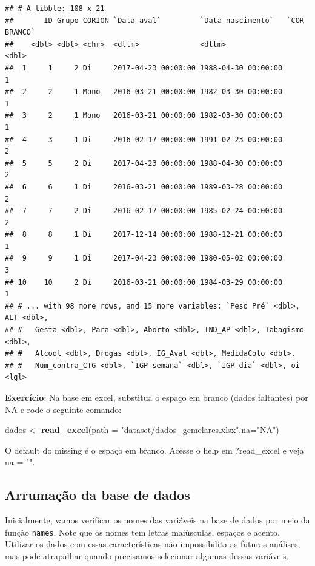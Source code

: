 \documentclass[
]{book}
\newenvironment{Shaded}{\begin{snugshade}}{\end{snugshade}}
\newcommand{\DataTypeTok}[1]{\textcolor[rgb]{0.13,0.29,0.53}{#1}}
\newcommand{\KeywordTok}[1]{\textcolor[rgb]{0.13,0.29,0.53}{\textbf{#1}}}
\newcommand{\NormalTok}[1]{#1}
\newcommand{\StringTok}[1]{\textcolor[rgb]{0.31,0.60,0.02}{#1}}
\begin{document}
\begin{verbatim}
## # A tibble: 108 x 21
##       ID Grupo CORION `Data aval`         `Data nascimento`   `COR BRANCO`
##    <dbl> <dbl> <chr>  <dttm>              <dttm>                     <dbl>
##  1     1     2 Di     2017-04-23 00:00:00 1988-04-30 00:00:00            1
##  2     2     1 Mono   2016-03-21 00:00:00 1982-03-30 00:00:00            1
##  3     2     1 Mono   2016-03-21 00:00:00 1982-03-30 00:00:00            1
##  4     3     1 Di     2016-02-17 00:00:00 1991-02-23 00:00:00            2
##  5     5     2 Di     2017-04-23 00:00:00 1988-04-30 00:00:00            2
##  6     6     1 Di     2016-03-21 00:00:00 1989-03-28 00:00:00            2
##  7     7     2 Di     2016-02-17 00:00:00 1985-02-24 00:00:00            2
##  8     8     1 Di     2017-12-14 00:00:00 1988-12-21 00:00:00            1
##  9     9     1 Di     2017-04-23 00:00:00 1980-05-02 00:00:00            3
## 10    10     2 Di     2016-03-21 00:00:00 1984-03-29 00:00:00            1
## # ... with 98 more rows, and 15 more variables: `Peso Pré` <dbl>, ALT <dbl>,
## #   Gesta <dbl>, Para <dbl>, Aborto <dbl>, IND_AP <dbl>, Tabagismo <dbl>,
## #   Alcool <dbl>, Drogas <dbl>, IG_Aval <dbl>, MedidaColo <dbl>,
## #   Num_contra_CTG <dbl>, `IGP semana` <dbl>, `IGP dia` <dbl>, oi <lgl>
\end{verbatim}

\textbf{Exercício}: Na base em excel, substitua o espaço em branco (dados faltantes) por NA e rode o seguinte comando:

\begin{Shaded}
\begin{Highlighting}[]
\NormalTok{dados <-}\StringTok{ }\KeywordTok{read_excel}\NormalTok{(}\DataTypeTok{path =} \StringTok{"dataset/dados_gemelares.xlsx"}\NormalTok{,}\DataTypeTok{na=}\StringTok{"NA"}\NormalTok{)}
\end{Highlighting}
\end{Shaded}

O default do missing é o espaço em branco. Acesse o help em ?read\_excel e veja na = "".

\hypertarget{arrumauxe7uxe3o-da-base-de-dados}{%
\subsection{Arrumação da base de dados}\label{arrumauxe7uxe3o-da-base-de-dados}}

Inicialmente, vamos verificar os nomes das variáveis na base de dados por meio da função \texttt{names}. Note que os nomes tem letras maiúsculas, espaços e acento. Utilizar os dados com essas características não impossibilita as futuras análises, mas pode atrapalhar quando precisamos selecionar algumas dessas variáveis.
\end{document}
